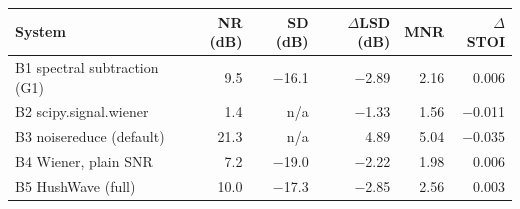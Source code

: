 \begin{tabular}{lrrrrr}
\toprule
System & NR (dB) & SD (dB) & $\Delta$LSD (dB) & MNR & $\Delta$STOI \\
\midrule
B1 spectral subtraction (G1) & 9.5 & $-$16.1 & $-$2.89 & 2.16 & 0.006 \\
B2 scipy.signal.wiener & 1.4 & n/a & $-$1.33 & 1.56 & $-$0.011 \\
B3 noisereduce (default) & 21.3 & n/a & 4.89 & 5.04 & $-$0.035 \\
B4 Wiener, plain SNR & 7.2 & $-$19.0 & $-$2.22 & 1.98 & 0.006 \\
B5 HushWave (full) & 10.0 & $-$17.3 & $-$2.85 & 2.56 & 0.003 \\
\bottomrule
\end{tabular}
